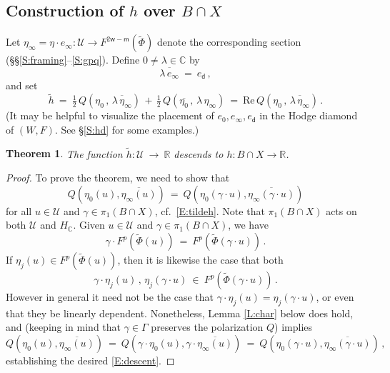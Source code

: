 \documentclass[12pt]{amsart}
\numberwithin{equation}{section}
\numberwithin{table}{section}
\def\bC{\mathbb{C}}
\def\sfm{\mathsf{m}}
\def\bR{\mathbb{R}}
\def\tRe{\mathrm{Re}} \def\tRic{\mathrm{Ric}}
\def\cU{\mathcal{U}}
\def\sfw{\mathsf{w}}
\def\half{\tfrac{1}{2}}
\newtheorem{theorem}[equation]{Theorem}
\theoremstyle{definition}
\theoremstyle{definition}
\theoremstyle{remark}
\def\sfd{\mathsf{d}}
\def\tPhi{\tilde\Phi}
\begin{document}
\subsection{Construction of $h$ over $B \cap X$} \label{S:dfnh}

Let $\eta_\infty = \eta \cdot e_\infty : \cU \to F^{2\sfw-\sfm}(\tPhi)$ denote the corresponding section (\S\S\ref{S:framing}--\ref{S:gpq}).  Define $0\not=\lambda \in \bC$ by 
\begin{equation}\label{E:lambda}
  \overline{\lambda\,e_\infty} \ = \ e_\sfd \,,
\end{equation}
and set
\begin{equation}\label{E:tildeh}
  \tilde h \ = \ \half\,Q(\eta_0 \,,\,\overline{\lambda\,\eta_\infty})
  \,+\, \half\,Q(\overline{\eta_0} \,,\,\lambda\,\eta_\infty) 
  \ = \ \tRe\,Q(\eta_0 \,,\,\overline{\lambda\,\eta_\infty}) \,.
\end{equation}
(It may be helpful to visualize the placement of $e_0,e_\infty,e_\sfd$ in the Hodge diamond of $(W,F)$.  See \S\ref{S:hd} for some examples.)

\begin{theorem} \label{T:descent}
The function $\tilde h : \cU \ \to \ \bR$ descends to $h:B \cap X \to \bR$.
\end{theorem}

\begin{proof}
To prove the theorem, we need to show that 
\begin{equation}\label{E:descent} 
  Q\left(\eta_0(u) , \overline{\eta_\infty(u)}\right) \ = \ Q\left(\eta_0(\gamma\cdot u) , \overline{\eta_\infty(\gamma \cdot u)}\right)
\end{equation}
for all $u \in \cU$ and $\gamma \in \pi_1(B \cap X)$, cf.~\eqref{E:tildeh}.  Note that $\pi_1(B \cap X)$ acts on both $\cU$ and $H_\bC$.  Given $u \in \cU$ and $\gamma \in \pi_1(B \cap X)$, we have
\[
  \gamma \cdot F^p(\tPhi(u)) \ = \ F^p(\tPhi(\gamma\cdot u)) \,.
\]
If $\eta_j(u) \in F^p(\tPhi(u))$, then it is likewise the case that both
\begin{equation}\label{E:gamma.eta}
  \gamma\cdot \eta_j(u)\,,\, \eta_j(\gamma \cdot u) 
  \ \in \ 
  F^p(\tPhi(\gamma\cdot u)) \,.
\end{equation}
However in general it need not be the case that $\gamma\cdot \eta_j(u) =  \eta_j(\gamma \cdot u)$, or even that they be linearly dependent.  Nonetheless, Lemma \ref{L:char} below does hold, and (keeping in mind that $\gamma \in \Gamma$ preserves the polarization $Q$) implies
\[
  Q\left( \eta_0(u) , \overline{\eta_\infty(u)} \right) 
  \ = \ 
  Q\left( \gamma \cdot \eta_0(u) , \gamma \cdot \overline{\eta_\infty(u)} \right) 
  \ = \ 
  Q\left( \eta_0(\gamma \cdot u) , \overline{\eta_\infty(\gamma \cdot u)} \right) \,,
\]
establishing the desired \eqref{E:descent}.
\end{proof}
\end{document}
